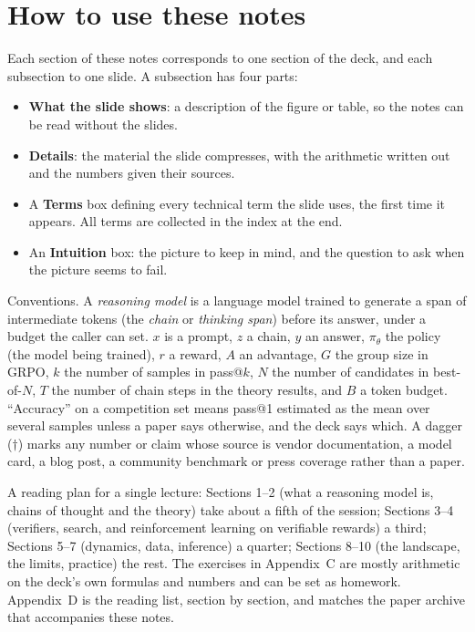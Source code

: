 \documentclass[11pt,letterpaper]{article}
\newcommand{\setstage}[1]{\colorlet{stagec}{#1}}
\begin{document}
\tableofcontents
\clearpage

\section*{How to use these notes}
Each section of these notes corresponds to one section of the deck, and each subsection to one slide. A subsection has four parts:
\begin{itemize}
  \item \textbf{What the slide shows}: a description of the figure or table, so the notes can be read without the slides.
  \item \textbf{Details}: the material the slide compresses, with the arithmetic written out and the numbers given their sources.
  \item A \textbf{Terms} box defining every technical term the slide uses, the first time it appears. All terms are collected in the index at the end.
  \item An \textbf{Intuition} box: the picture to keep in mind, and the question to ask when the picture seems to fail.
\end{itemize}
Conventions. A \emph{reasoning model} is a language model trained to generate a span of intermediate tokens (the \emph{chain} or \emph{thinking span}) before its answer, under a budget the caller can set. $x$ is a prompt, $z$ a chain, $y$ an answer, $\pi_\theta$ the policy (the model being trained), $r$ a reward, $A$ an advantage, $G$ the group size in GRPO, $k$ the number of samples in pass@$k$, $N$ the number of candidates in best-of-$N$, $T$ the number of chain steps in the theory results, and $B$ a token budget. ``Accuracy'' on a competition set means pass@1 estimated as the mean over several samples unless a paper says otherwise, and the deck says which. A dagger ($\dagger$) marks any number or claim whose source is vendor documentation, a model card, a blog post, a community benchmark or press coverage rather than a paper.

A reading plan for a single lecture: Sections 1--2 (what a reasoning model is, chains of thought and the theory) take about a fifth of the session; Sections 3--4 (verifiers, search, and reinforcement learning on verifiable rewards) a third; Sections 5--7 (dynamics, data, inference) a quarter; Sections 8--10 (the landscape, the limits, practice) the rest. The exercises in Appendix~C are mostly arithmetic on the deck's own formulas and numbers and can be set as homework. Appendix~D is the reading list, section by section, and matches the paper archive that accompanies these notes.
\setstage{ink}
\end{document}
